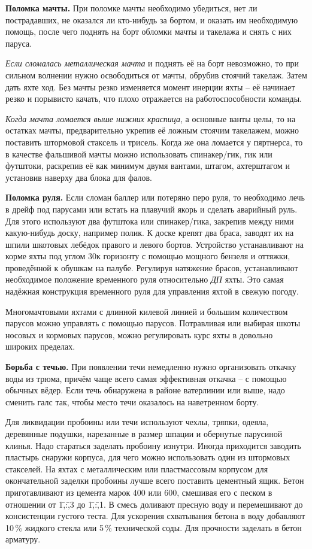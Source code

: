 \textbf{Поломка мачты.} При поломке мачты необходимо убедиться, нет ли
пострадавших, не оказался ли кто-нибудь за бортом, и оказать им
необходимую помощь, после чего поднять на борт обломки мачты и
такелажа и снять с них паруса.

\textit{Если сломалась металлическая мачта} и поднять её на борт
невозможно, то при сильном волнении нужно освободиться от мачты,
обрубив стоячий такелаж. Затем дать яхте ход. Без мачты резко
изменяется момент инерции яхты \--- её начинает резко и порывисто
качать, что плохо отражается на работоспособности команды.

\textit{Когда мачта ломается выше нижних краспица}, а основные ванты
целы, то на остатках мачты, предварительно укрепив её ложным стоячим
такелажем, можно поставить штормовой стаксель и трисель. Когда же она
ломается у пяртнерса, то в качестве фальшивой мачты можно использовать
спинакер\-/гик, гик или футштоки, раскрепив её как минимум двумя
вантами, штагом, ахтерштагом и установив наверху два блока для фалов.

\textbf{Поломка руля.} Если сломан баллер или потеряно перо руля, то
необходимо лечь в дрейф под парусами или встать на плавучий якорь и
сделать аварийный руль. Для этого используют два футштока или
спинакер\-/гика, закрепив между ними какую-нибудь доску, например
полик. К доске крепят два браса, заводят их на шпили шкотовых лебёдок
правого и левого бортов. Устройство устанавливают на корме яхты под
углом 30\gr к горизонту с помощью мощного бензеля и оттяжки,
проведённой к обушкам на палубе. Регулируя натяжение брасов,
устанавливают необходимое положение временного руля относительно
\textit{ДП} яхты. Это самая надёжная конструкция временного руля для
управления яхтой в свежую погоду.

Многомачтовыми яхтами с длинной килевой линией и большим количеством
парусов можно управлять с помощью парусов. Потравливая или выбирая
шкоты носовых и кормовых парусов, можно регулировать курс яхты в
довольно широких пределах.

\textbf{Борьба с течью.} При появлении течи немедленно нужно
организовать откачку воды из трюма, причём чаще всего самая
эффективная откачка \--- с помощью обычных вёдер. Если течь обнаружена
в районе ватерлинии или выше, надо сменить галс так, чтобы место течи
оказалось на наветренном борту.

Для ликвидации пробоины или течи используют чехлы, тряпки, одеяла,
деревянные подушки, нарезанные в размер шпации и обернутые парусиной
клинья. Надо стараться заделать пробоину изнутри. Иногда приходится
заводить пластырь снаружи корпуса, для чего можно использовать один из
штормовых стакселей. На яхтах с металлическим или пластмассовым
корпусом для окончательной заделки пробоины лучше всего поставить
цементный ящик. Бетон приготавливают из цемента марок 400 или 600,
смешивая его с песком в отношении от 1\=,:\=,3 до 1\=,:\=,1. В смесь
доливают пресную воду и перемешивают до консистенции густого
теста. Для ускорения схватывания бетона в воду добавляют 10\,\%
жидкого стекла или 5\,\% технической соды. Для прочности заделать в
бетон арматуру.

